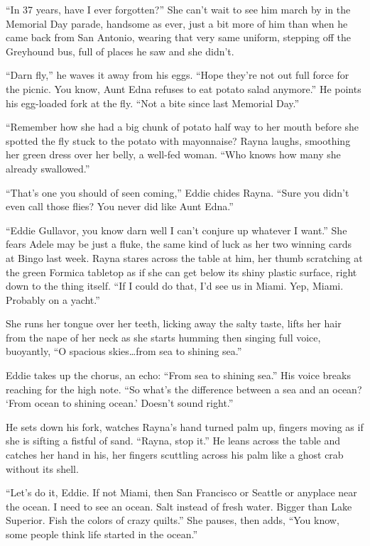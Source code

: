\documentclass[twoside,10pt]{book}
\begin{document}
``In 37 years, have I ever forgotten?'' She can't wait to see him march
by in the Memorial Day parade, handsome as ever, just a bit more of him
than when he came back from San Antonio, wearing that very same uniform,
stepping off the Greyhound bus, full of places he saw and she didn't.

``Darn fly,'' he waves it away from his eggs. ``Hope they're not out
full force for the picnic. You know, Aunt Edna refuses to eat potato
salad anymore.'' He points his egg-loaded fork at the fly. ``Not a bite
since last Memorial Day.''

``Remember how she had a big chunk of potato half way to her mouth
before she spotted the fly stuck to the potato with mayonnaise? Rayna
laughs, smoothing her green dress over her belly, a well-fed woman.
``Who knows how many she already swallowed.''

``That's one you should of seen coming,'' Eddie chides Rayna. ``Sure you
didn't even call those flies? You never did like Aunt Edna.''

``Eddie Gullavor, you know darn well I can't conjure up whatever I
want.'' She fears Adele may be just a fluke, the same kind of luck as
her two winning cards at Bingo last week. Rayna stares across the table
at him, her thumb scratching at the green Formica tabletop as if she can
get below its shiny plastic surface, right down to the thing itself.
``If I could do that, I'd see us in Miami. Yep, Miami. Probably on a
yacht.''

She runs her tongue over her teeth, licking away the salty taste, lifts
her hair from the nape of her neck as she starts humming then singing
full voice, buoyantly, ``O spacious skies\ldots from sea to shin­ing
sea.''

Eddie takes up the chorus, an echo: ``From sea to shining sea.'' His
voice breaks reaching for the high note. ``So what's the difference
between a sea and an ocean? `From ocean to shining ocean.' Doesn't sound
right.''

He sets down his fork, watches Rayna's hand turned palm up, fingers
moving as if she is sifting a fistful of sand. ``Rayna, stop it.'' He
leans across the table and catches her hand in his, her fingers
scuttling across his palm like a ghost crab without its shell.

``Let's do it, Eddie. If not Miami, then San Francisco or Seattle or
anyplace near the ocean. I need to see an ocean. Salt instead of fresh
water. Bigger than Lake Superior. Fish the colors of crazy quilts.'' She
pauses, then adds, ``You know, some people think life started in the
ocean.''
\end{document}
